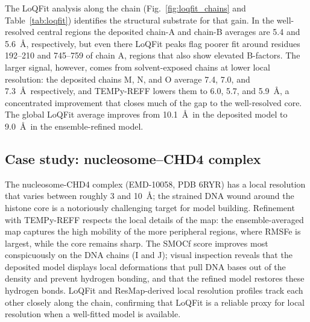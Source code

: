 \documentclass[11pt]{article}
\begin{document}
The LoQFit analysis along the chain (Fig.~\ref{fig:loqfit_chains} and Table~\ref{tab:loqfit}) identifies the structural substrate for that gain. In the well-resolved central regions the deposited chain-A and chain-B averages are 5.4 and 5.6~\AA, respectively, but even there LoQFit peaks flag poorer fit around residues 192--210 and 745--759 of chain A, regions that also show elevated B-factors. The larger signal, however, comes from solvent-exposed chains at lower local resolution: the deposited chains M, N, and O average 7.4, 7.0, and 7.3~\AA\ respectively, and TEMPy-REFF lowers them to 6.0, 5.7, and 5.9~\AA, a concentrated improvement that closes much of the gap to the well-resolved core. The global LoQFit average improves from 10.1~\AA\ in the deposited model to 9.0~\AA\ in the ensemble-refined model.

\subsection{Case study: nucleosome--CHD4 complex}
The nucleosome-CHD4 complex (EMD-10058, PDB 6RYR) has a local resolution that varies between roughly 3 and 10~\AA; the strained DNA wound around the histone core is a notoriously challenging target for model building. Refinement with TEMPy-REFF respects the local details of the map: the ensemble-averaged map captures the high mobility of the more peripheral regions, where RMSFe is largest, while the core remains sharp. The SMOCf score improves most conspicuously on the DNA chains (I and J); visual inspection reveals that the deposited model displays local deformations that pull DNA bases out of the density and prevent hydrogen bonding, and that the refined model restores these hydrogen bonds. LoQFit and ResMap-derived local resolution profiles track each other closely along the chain, confirming that LoQFit is a reliable proxy for local resolution when a well-fitted model is available.
\end{document}

